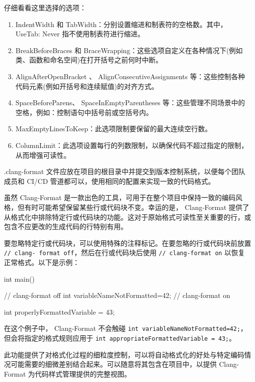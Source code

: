 仔细看看这里选择的选项：

\begin{enumerate}
\item
IndentWidth 和 TabWidth：分别设置缩进和制表符的空格数。其中， UseTab: Never 指不使用制表符进行缩进。

\item
BreakBeforeBraces 和 BraceWrapping：这些选项自定义在各种情况下(例如类、函数和命名空间)在打开括号之前何时中断。

\item
AlignAfterOpenBracket 、 AlignConsecutiveAssignments 等：这些控制各种代码元素(例如开括号和连续赋值)的对齐方式。

\item
SpaceBeforeParens、 SpaceInEmptyParentheses 等：这些管理不同场景中的空格，例如：控制语句中括号前或空括号内。

\item
MaxEmptyLinesToKeep：此选项限制要保留的最大连续空行数。

\item
ColumnLimit：此选项设置每行的列数限制，以确保代码不超过指定的限制，从而增强可读性。
\end{enumerate}

.clang-format 文件应放在项目的根目录中并提交到版本控制系统，以便每个团队成员和 CI/CD 管道都可以，使用相同的配置来实现一致的代码格式。


虽然 Clang-Format 是一款出色的工具，可用于在整个项目中保持一致的编码风格，但有时可能希望保留某些行或代码块不变。幸运的是， Clang-Format 提供了从格式化中排除特定行或代码块的功能。这对于原始格式可读性至关重要的行，或包含不应更改的生成代码的行特别有用。

要忽略特定行或代码块，可以使用特殊的注释标记。在要忽略的行或代码块前放置 \verb|// clang- format off|，然后在行或代码块后使用 \verb|// clang-format on| 以恢复正常格式。以下是示例：

\begin{cpp}
int main() {
    // clang-format off
    int variableNameNotFormatted=42;
    // clang-format on

    int properlyFormattedVariable = 43;
}
\end{cpp}

在这个例子中， Clang-Format 不会触碰 \verb|int variableNameNotFormatted=42;|，但会将指定的格式规则应用于 \verb|int appropriateFormattedVariable = 43;|。

此功能提供了对格式化过程的细粒度控制，可以将自动格式化的好处与特定编码情况可能需要的细微差别结合起来。可以随意将其包含在项目中，以提供 Clang-Format 为代码样式管理提供的完整视图。

